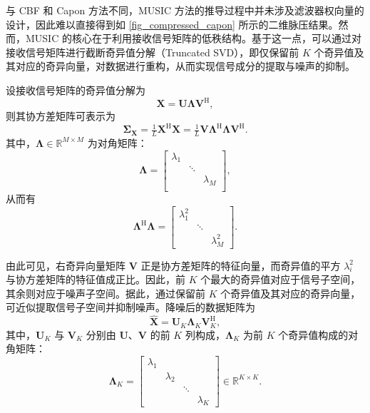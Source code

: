 与 CBF 和 Capon 方法不同，MUSIC 方法的推导过程中并未涉及滤波器权向量的设计，因此难以直接得到如 \cref{fig_compressed_capon} 所示的二维脉压结果。然而，MUSIC 的核心在于利用接收信号矩阵的低秩结构。基于这一点，可以通过对接收信号矩阵进行截断奇异值分解（Truncated SVD），即仅保留前 \(K\) 个奇异值及其对应的奇异向量，对数据进行重构，从而实现信号成分的提取与噪声的抑制。

设接收信号矩阵的奇异值分解为
\[
    \mathbf{X} = \mathbf{U}\mathbf{\Lambda}\mathbf{V}^{\mathrm{H}},
\]
则其协方差矩阵可表示为
\[
    \mathbf{\Sigma}_{\mathbf{X}}
    = \tfrac{1}{L}\mathbf{X}^{\mathrm{H}}\mathbf{X}
    = \tfrac{1}{L}\mathbf{V}\mathbf{\Lambda}^{\mathrm{H}}\mathbf{\Lambda}\mathbf{V}^{\mathrm{H}}.
\]
其中，\(\mathbf{\Lambda}\in\mathbb{R}^{M\times M}\) 为对角矩阵：
\[
    \mathbf{\Lambda} = \begin{bmatrix}
        \lambda_1 &        &           \\
                  & \ddots &           \\
                  &        & \lambda_M \\
    \end{bmatrix},
\]
从而有
\[
    \mathbf{\Lambda}^{\mathrm{H}} \mathbf{\Lambda} = \begin{bmatrix}
        \lambda_1^2 &        &             \\
                    & \ddots &             \\
                    &        & \lambda_M^2
    \end{bmatrix}.
\]

由此可见，右奇异向量矩阵 \(\mathbf{V}\) 正是协方差矩阵的特征向量，而奇异值的平方 \(\lambda_i^2\) 与协方差矩阵的特征值成正比。因此，前 \(K\) 个最大的奇异值对应于信号子空间，其余则对应于噪声子空间。据此，通过保留前 \(K\) 个奇异值及其对应的奇异向量，可近似提取信号子空间并抑制噪声。降噪后的数据矩阵为
\[
    \hat{\mathbf{X}} = \mathbf{U}_K \mathbf{\Lambda}_K \mathbf{V}_K^{\mathrm{H}},
\]
其中，\(\mathbf{U}_K\) 与 \(\mathbf{V}_K\) 分别由 \(\mathbf{U}\)、\(\mathbf{V}\) 的前 \(K\) 列构成，\(\mathbf{\Lambda}_K\) 为前 \(K\) 个奇异值构成的对角矩阵：
\[
    \mathbf{\Lambda}_K =
    \begin{bmatrix}
        \lambda_1 &           &        &           \\
                  & \lambda_2 &        &           \\
                  &           & \ddots &           \\
                  &           &        & \lambda_K
    \end{bmatrix} \in \mathbb{R}^{K\times K}.
\]


